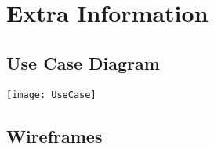 \chapter{Extra Information}
\section{Use Case Diagram} \label{UseCase}
\texttt{[image: UseCase]}

\newpage

\section{Wireframes} \label{wireframes}